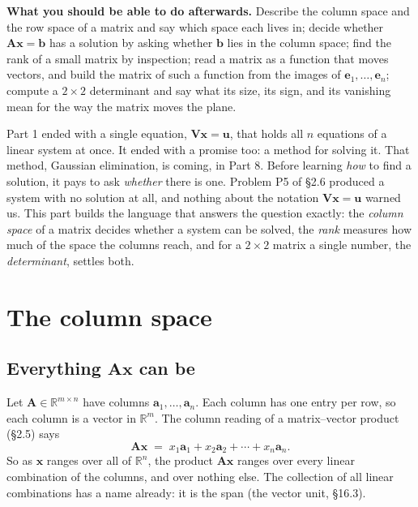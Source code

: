\documentclass[11pt]{article}
\theoremstyle{plain}
\theoremstyle{definition}
\theoremstyle{remark}
\newcommand{\R}{\mathbb{R}}
\newcommand{\vc}[1]{\mathbf{#1}}        %
\newcommand{\mt}[1]{\mathbf{#1}}        %
\begin{document}
\medskip
\noindent\textbf{What you should be able to do afterwards.} Describe the
column space and the row space of a matrix and say which space each lives in;
decide whether $\mt{A}\vc{x}=\vc{b}$ has a solution by asking whether
$\vc{b}$ lies in the column space; find the rank of a small matrix by
inspection; read a matrix as a function that moves vectors, and build the
matrix of such a function from the images of $\vc{e}_1,\dots,\vc{e}_n$; compute
a $2\times2$ determinant and say what its size, its sign, and its vanishing
mean for the way the matrix moves the plane.

\bigskip
\noindent Part 1 ended with a single equation, $\mt{V}\vc{x}=\vc{u}$, that
holds all $n$ equations of a linear system at once. It ended with a promise
too: a method for solving it. That method, Gaussian elimination, is coming, in
Part 8. Before learning \emph{how} to find a solution, it pays to ask
\emph{whether} there is one. Problem P5 of \S2.6 produced a system with no
solution at all, and nothing about the notation $\mt{V}\vc{x}=\vc{u}$ warned
us. This part builds the language that answers the question exactly: the
\emph{column space} of a matrix decides whether a system can be solved, the
\emph{rank} measures how much of the space the columns reach, and for a
$2\times2$ matrix a single number, the \emph{determinant}, settles both.

\section{The column space}

\subsection{Everything \texorpdfstring{$\mt{A}\vc{x}$}{Ax} can be}
Let $\mt{A}\in\R^{m\times n}$ have columns
$\vc{a}_1,\dots,\vc{a}_n$. Each column has one entry per row, so each column
is a vector in $\R^{m}$. The column reading of a matrix--vector product
(\S2.5) says
\[
  \mt{A}\vc{x} \;=\; x_1\vc{a}_1 + x_2\vc{a}_2 + \cdots + x_n\vc{a}_n .
\]
So as $\vc{x}$ ranges over all of $\R^{n}$, the product $\mt{A}\vc{x}$ ranges
over every linear combination of the columns, and over nothing else. The
collection of all linear combinations has a name already: it is the span
(the vector unit, \S16.3).
\end{document}
